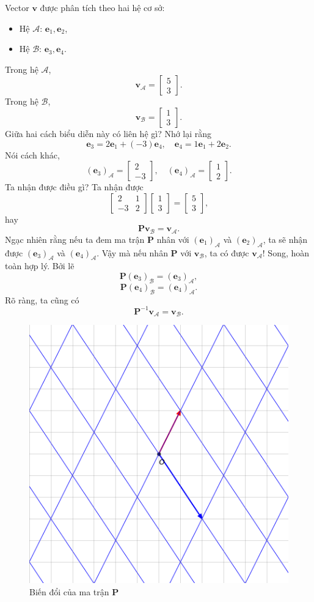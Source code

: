 Vector \(\mathbf{v}\) được phân tích theo hai hệ cơ sở:
\begin{itemize}
    \item Hệ \(\mathcal{A}\): \(\mathbf{e}_1 ,\mathbf{e}_2\),
    \item Hệ \(\mathcal{B}\): \(\mathbf{e}_3 ,\mathbf{e}_4\).
\end{itemize}
Trong hệ \(\mathcal{A}\), \[\mathbf{v}_{\mathcal{A}}=\begin{bmatrix}
    5\\3
\end{bmatrix}.\] Trong hệ \(\mathcal{B}\), \[\mathbf{v}_{\mathcal{B}}=\begin{bmatrix}
    1\\3
\end{bmatrix}.\] Giữa hai cách biểu diễn này có liên hệ gì? Nhớ lại rằng
\[\mathbf{e}_3 =2\mathbf{e}_1 +(-3)\mathbf{e}_4 ,\quad \mathbf{e}_4 =1\mathbf{e}_1 +2\mathbf{e}_2 .\]
Nói cách khác, \[(\mathbf{e}_3)_{\mathcal{A}}=\begin{bmatrix}
    2\\-3
\end{bmatrix},\quad (\mathbf{e}_{4})_{\mathcal{A}}=\begin{bmatrix}
    1\\2
\end{bmatrix}.\] Ta nhận được điều gì? Ta nhận được
\[\begin{bmatrix}
    2&1\\-3&2
\end{bmatrix}\begin{bmatrix}
    1\\3
\end{bmatrix}=\begin{bmatrix}
    5\\3
\end{bmatrix},\] hay
\[\mathbf{P}\mathbf{v}_{\mathcal{B}}=\mathbf{v}_{\mathcal{A}}.\] Ngạc nhiên rằng nếu ta đem ma trận \(\mathbf{P}\) nhân với 
\((\mathbf{e}_1)_{\mathcal{A}}\) và \((\mathbf{e}_2)_{\mathcal{A}}\), ta sẽ nhận được \((\mathbf{e}_3)_{\mathcal{A}}\) và \((\mathbf{e}_4)_{\mathcal{A}}\). Vậy mà nếu nhân \(\mathbf{P}\) với \(\mathbf{v}_{\mathcal{B}}\), ta có được \(\mathbf{v}_{\mathcal{A}}\)!
Song, hoàn toàn hợp lý. Bởi lẽ \[\mathbf{P}(\mathbf{e}_3)_{\mathcal{B}}=(\mathbf{e}_3)_{\mathcal{A}},\]
\[\mathbf{P}(\mathbf{e}_4)_{\mathcal{B}}=(\mathbf{e}_4)_{\mathcal{A}}.\] 
Rõ ràng, ta cũng có \[\mathbf{P}^{-1}\mathbf{v}_{\mathcal{A}}=\mathbf{v}_{\mathcal{B}}.\]
\begin{figure}[H]
    \centering
    \includegraphics[width=0.4\linewidth]{Tuan2/Figures/LT10.png}
    \caption{Biến đổi của ma trận \(\mathbf{P}\)}
\end{figure}
